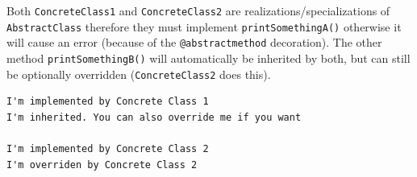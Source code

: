 \begin{Shaded}
\begin{Highlighting}[]
    \NormalTok{):}

    \NormalTok{):}
        \NormalTok{(}\NormalTok{)}

    \NormalTok{):}
        \NormalTok{(}\NormalTok{)}

    \NormalTok{):}
        \NormalTok{(}\NormalTok{)}

    \NormalTok{):}
        \NormalTok{(}\NormalTok{)}
\end{Highlighting}
\end{Shaded}

Both \texttt{ConcreteClass1} and \texttt{ConcreteClass2} are
realizations/specializations of \texttt{AbstractClass} therefore they
must implement \texttt{printSomethingA()} otherwise it will cause an
error (because of the \texttt{@abstractmethod} decoration). The other
method \texttt{printSomethingB()} will automatically be inherited by
both, but can still be optionally overridden (\texttt{ConcreteClass2}
does this).

\begin{Shaded}
\begin{Highlighting}[]
\NormalTok{()}
\end{Highlighting}
\end{Shaded}

\begin{verbatim}
I'm implemented by Concrete Class 1
I'm inherited. You can also override me if you want

I'm implemented by Concrete Class 2
I'm overriden by Concrete Class 2
\end{verbatim}

